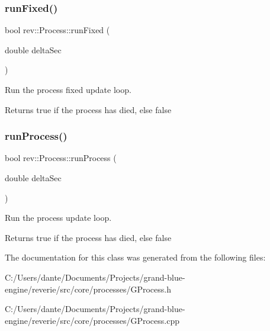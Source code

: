 \mbox{\label{classrev_1_1_process_aedd5f4e2b9188fa376e36c3478db68a5}} 
\subsubsection{\texorpdfstring{runFixed()}{runFixed()}}
{\footnotesize\ttfamily bool rev\+::\+Process\+::run\+Fixed (\begin{DoxyParamCaption}\item[{double}]{delta\+Sec }\end{DoxyParamCaption})\hspace{0.3cm}{\ttfamily [virtual]}}



Run the process fixed update loop. 

Returns true if the process has died, else false \mbox{\label{classrev_1_1_process_a0773cd6049d050ebcf72cd1034929c9c}} 
\subsubsection{\texorpdfstring{runProcess()}{runProcess()}}
{\footnotesize\ttfamily bool rev\+::\+Process\+::run\+Process (\begin{DoxyParamCaption}\item[{double}]{delta\+Sec }\end{DoxyParamCaption})\hspace{0.3cm}{\ttfamily [virtual]}}



Run the process update loop. 

Returns true if the process has died, else false 

The documentation for this class was generated from the following files\+:\begin{DoxyCompactItemize}
\item 
C\+:/\+Users/dante/\+Documents/\+Projects/grand-\/blue-\/engine/reverie/src/core/processes/G\+Process.\+h\item 
C\+:/\+Users/dante/\+Documents/\+Projects/grand-\/blue-\/engine/reverie/src/core/processes/G\+Process.\+cpp\end{DoxyCompactItemize}
